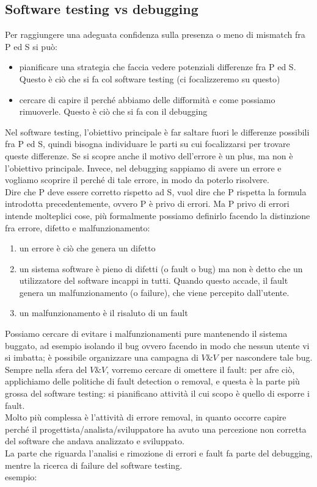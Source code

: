 \documentclass{article}
\begin{document}
\subsection{Software testing vs debugging}
Per raggiungere una adeguata confidenza sulla presenza o meno di mismatch fra P ed S si può:
\begin{itemize}
\item pianificare una strategia che faccia vedere potenziali differenze fra P ed S. Questo è ciò che si fa col software testing (ci focalizzeremo su questo)
\item cercare di capire il perché abbiamo delle difformità e come possiamo rimuoverle. Questo è ciò che si fa con il debugging
\end{itemize}
Nel software testing, l'obiettivo principale è far saltare fuori le differenze possibili fra P ed S, quindi bisogna individuare le parti su cui focalizzarsi per trovare queste differenze. Se si scopre anche il motivo dell'errore è un plus, ma non è l'obiettivo principale. Invece, nel debugging sappiamo di avere un errore e vogliamo scoprire il perché di tale errore, in modo da poterlo risolvere.\\ Dire che P deve essere corretto rispetto ad S, vuol dire che P rispetta la formula introdotta precedentemente, ovvero P è privo di errori. Ma P privo di errori intende molteplici cose, più formalmente possiamo definirlo facendo la distinzione fra errore, difetto e malfunzionamento:
\begin{enumerate}
\item un errore è ciò che genera un difetto
\item un sistema software è pieno di difetti (o fault o bug) ma non è detto che un utilizzatore del software incappi in tutti. Quando questo accade, il fault genera un malfunzionamento (o failure), che viene percepito dall'utente.
\item un malfunzionamento è il risaluto di un fault
\end{enumerate}
Possiamo cercare di evitare i malfunzionamenti pure mantenendo il sistema buggato, ad esempio isolando il bug ovvero facendo in modo che nessun utente vi si imbatta; è possibile organizzare una campagna di $V\&V$ per nascondere tale bug.\\ Sempre nella sfera del $V\&V$, vorremo cercare di omettere il fault: per afre ciò, applichiamo delle politiche di fault detection o removal, e questa è la parte più grossa del software testing: si pianificano attività il cui scopo è quello di esporre i fault.\\ Molto più complessa è l'attività di errore removal, in quanto occorre capire perché il progettista/analista/sviluppatore ha avuto una percezione non corretta del software che andava analizzato e sviluppato.\\ La parte che riguarda l'analisi e rimozione di errori e fault fa parte del debugging, mentre la ricerca di failure del software testing.\\ esempio:\\
\end{document}
